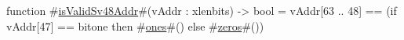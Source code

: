 function #\hyperref[sailRISCVzisValidSv48Addr]{isValidSv48Addr}#(vAddr : xlenbits) -> bool = {
  vAddr[63 .. 48] == (if   vAddr[47] == bitone
                      then #\hyperref[sailRISCVzones]{ones}#()
                      else #\hyperref[sailRISCVzzzeros]{zeros}#())
}
